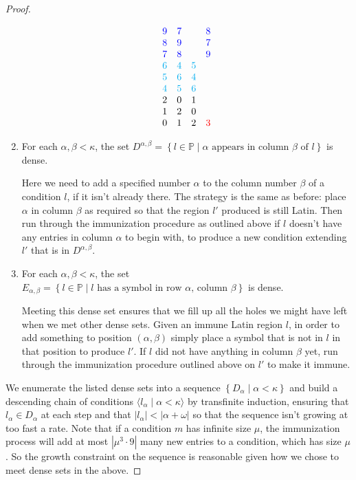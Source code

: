 \documentclass[12pt,a4paper]{article}
\newcommand{\st}{\; | \;}
\newcommand{\set}[2]{\left\{#1\st #2 \right\}}
\newcommand{\seq}[2]{\langle #1 \st #2 \rangle}
\renewcommand{\P}{\mathbb{P}}
\begin{document}
\begin{proof}
\begin{enumerate}
$$\begin{array}{cccc}
						\color{blue}9&\color{blue}7&&\color{blue}8\\
						\color{blue}8&\color{blue}9&&\color{blue}7\\
						\color{blue}7&\color{blue}8&&\color{blue}9\\
						\color{cyan}6&\color{cyan}4&\color{cyan}5&\\
						\color{cyan}5&\color{cyan}6&\color{cyan}4&\\
						\color{cyan}4&\color{cyan}5&\color{cyan}6&\\
						2  & 0   &  1 &\\ 
						1 & 2 &  0 &  \\
						0  & 1 & 2 & {\textcolor{red} 3}
		\end{array}$$
	
		\item For each $\alpha, \beta<\kappa$, the set $D^{\alpha, \beta}=\set{l\in \P}{\alpha \text{ appears in column } \beta \text{ of } l}$ is dense. 
		
		Here we need to add a specified number $\alpha$ to the column number $\beta$ of a condition $l$, if it isn't already there. The strategy is the same as before: place $\alpha$ in column $\beta$ as required so that the region $l'$ produced is still Latin. Then run through the immunization procedure as outlined above if $l$ doesn't have any entries in column $\alpha$ to begin with, to produce a new condition extending $l'$ that is in $D^{\alpha, \beta}$.
		
		\item For each $\alpha, \beta < \kappa$, the set $E_{\alpha, \beta}=\set{l \in \P}{\text{$l$ has a symbol in row $\alpha$, column $\beta$}}$ is dense.
		
		Meeting this dense set ensures that we fill up all the holes we might have left when we met other dense sets. Given an immune Latin region $l$, in order to add something to position $(\alpha, \beta)$ simply place a symbol that is not in $l$ in that position to produce $l'$. If $l$ did not have anything in column $\beta$ yet, run through the immunization procedure outlined above on $l'$ to make it immune.
\end{enumerate}

We enumerate the listed dense sets into a sequence $\set{D_\alpha}{\alpha<\kappa}$ and build a descending chain of conditions $\seq{l_\alpha}{\alpha<\kappa}$ by transfinite induction, ensuring that $l_\alpha\in D_\alpha$ at each step and that $|l_\alpha|<|\alpha+\omega|$ so that the sequence isn't growing at too fast a rate. Note that if a condition $m$ has infinite size $\mu$, the immunization process will add at most $|\mu^3 \cdot 9|$ many new entries to a condition, which has size $\mu$. So the growth constraint on the sequence is reasonable given how we chose to meet dense sets in the above.


\end{proof}
\end{document}
